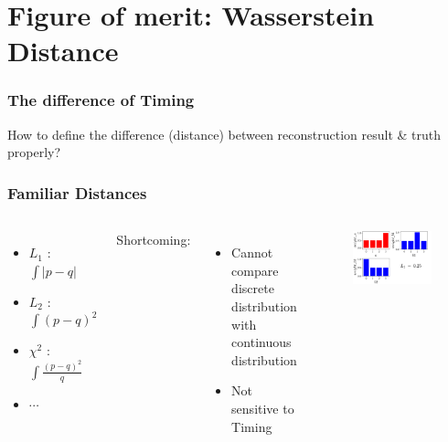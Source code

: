 \documentclass{beamer}
\begin{document}
\section{Figure of merit: Wasserstein Distance}
\begin{frame}
\frametitle{The difference of Timing}
\begin{center}
    How to define the difference (distance) between reconstruction result \& truth properly?
\end{center}
\end{frame}

\begin{frame}
\frametitle{Familiar Distances}
\begin{columns}
\begin{itemize}
    \item $L_{1}$ : $\int|p-q|$
    \item $L_{2}$ : $\int(p-q)^{2}$
    \item $\chi^{2}$ : $\int\frac{(p-q)^{2}}{q}$
    \item $\cdots$
\end{itemize}
Shortcoming:
\begin{itemize}
    \item Cannot compare discrete distribution with continuous distribution
    \item Not sensitive to Timing
\end{itemize}
\begin{figure}
    \centering
    \includegraphics[width=1.0\linewidth]{img/tab.png}
\end{figure}
\end{columns}
\end{frame}
\end{document}
